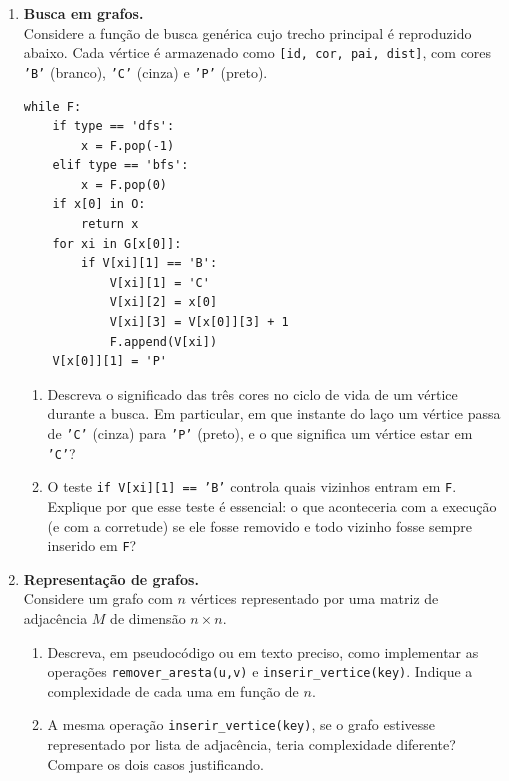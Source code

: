 \documentclass[10pt,a4paper]{extarticle}
\begin{document}
\begin{enumerate}[label=\textbf{\arabic*.}, itemsep=0.7cm, leftmargin=*]

\item \textbf{Busca em grafos.} \\
Considere a função de busca genérica cujo trecho principal é reproduzido abaixo. Cada vértice é armazenado como \texttt{[id, cor, pai, dist]}, com cores \texttt{'B'} (branco), \texttt{'C'} (cinza) e \texttt{'P'} (preto).

\begin{lstlisting}
while F:
    if type == 'dfs':
        x = F.pop(-1)
    elif type == 'bfs':
        x = F.pop(0)
    if x[0] in O:
        return x
    for xi in G[x[0]]:
        if V[xi][1] == 'B':
            V[xi][1] = 'C'
            V[xi][2] = x[0]
            V[xi][3] = V[x[0]][3] + 1
            F.append(V[xi])
    V[x[0]][1] = 'P'
\end{lstlisting}

\begin{enumerate}[label=(\alph*)]
    \item Descreva o significado das três cores no ciclo de vida de um vértice durante a busca. Em particular, em que instante do laço um vértice passa de \texttt{'C'} (cinza) para \texttt{'P'} (preto), e o que significa um vértice estar em \texttt{'C'}?
    \item O teste \texttt{if V[xi][1] == 'B'} controla quais vizinhos entram em \texttt{F}. Explique por que esse teste é essencial: o que aconteceria com a execução (e com a corretude) se ele fosse removido e todo vizinho fosse sempre inserido em \texttt{F}?
\end{enumerate}

\item \textbf{Representação de grafos.} \\
Considere um grafo com $n$ vértices representado por uma matriz de adjacência $M$ de dimensão $n \times n$.

\begin{enumerate}[label=(\alph*)]
    \item Descreva, em pseudocódigo ou em texto preciso, como implementar as operações \texttt{remover\_aresta(u,v)} e \texttt{inserir\_vertice(key)}. Indique a complexidade de cada uma em função de $n$.
    \item A mesma operação \texttt{inserir\_vertice(key)}, se o grafo estivesse representado por lista de adjacência, teria complexidade diferente? Compare os dois casos justificando.
\end{enumerate}


\end{enumerate}
\end{document}
